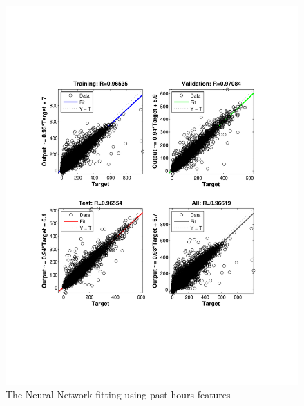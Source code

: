 \documentclass{sig-alternate}
\begin{document}
\begin{figure}
\centering
\includegraphics[scale = 0.4]{pic/reg1.pdf}
\caption{The Neural Network fitting using past hours features}
\end{figure}
\end{document}
